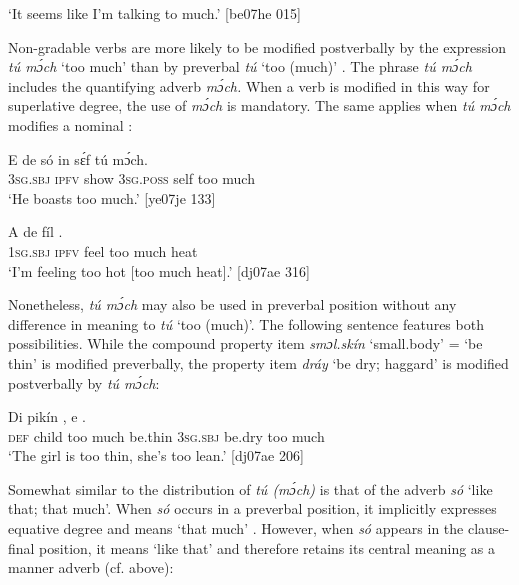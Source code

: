 \glt ‘It seems like I’m talking to much.’ [be07he 015]
\z

Non-gradable verbs are more likely to be modified postverbally by the expression \textit{tú mɔ́ch} ‘too much’ than by preverbal \textit{tú} ‘too (much)’ . The phrase \textit{tú mɔ́ch} includes the quantifying adverb \textit{mɔ́ch.} When a verb is modified in this way for superlative degree, the use of \textit{mɔ́ch} is mandatory. The same applies when \textit{tú mɔ́ch} modifies a nominal :


\ea%
    \label{ex:key:861}
    \gll E    de  só    in    sɛ́f  tú  mɔ́ch.\\
\textsc{3sg.sbj}  \textsc{ipfv}  show  \textsc{3sg.poss}  self  too  much\\

\glt ‘He boasts too much.’ [ye07je 133]
\z


\ea%
    \label{ex:key:862}
    \gll A    de  fíl      .\\
\textsc{1sg.sbj}  \textsc{ipfv}  feel  too  much  heat\\

\glt ‘I’m feeling too hot [too much heat].’ [dj07ae 316]
\z

Nonetheless, \textit{tú mɔ́ch} may also be used in preverbal position without any difference in meaning to \textit{tú} ‘too (much)’. The following sentence features both possibilities. While the compound property item \textit{smɔl.skín} ‘small.body’ = ‘be thin’ is modified preverbally, the property item \textit{dráy} ‘be dry; haggard’ is modified postverbally by \textit{tú mɔ́ch}: 


\ea%
    \label{ex:key:863}
    \gll Di  pikín      ,  e        .\\
\textsc{def}  child  too  much  be.thin    \textsc{3sg.sbj}  be.dry  too  much\\

\glt ‘The girl is too thin, she’s too lean.’ [dj07ae 206]
\z

Somewhat similar to the distribution of \textit{tú (mɔ́ch)} is that of the adverb \textit{só} ‘like that; that much’. When \textit{só} occurs in a preverbal position, it implicitly expresses equative degree and means ‘that much’ . However, when \textit{só} appears in the clause-final position, it means ‘like that’ and therefore retains its central meaning as a manner adverb (cf.  above):



